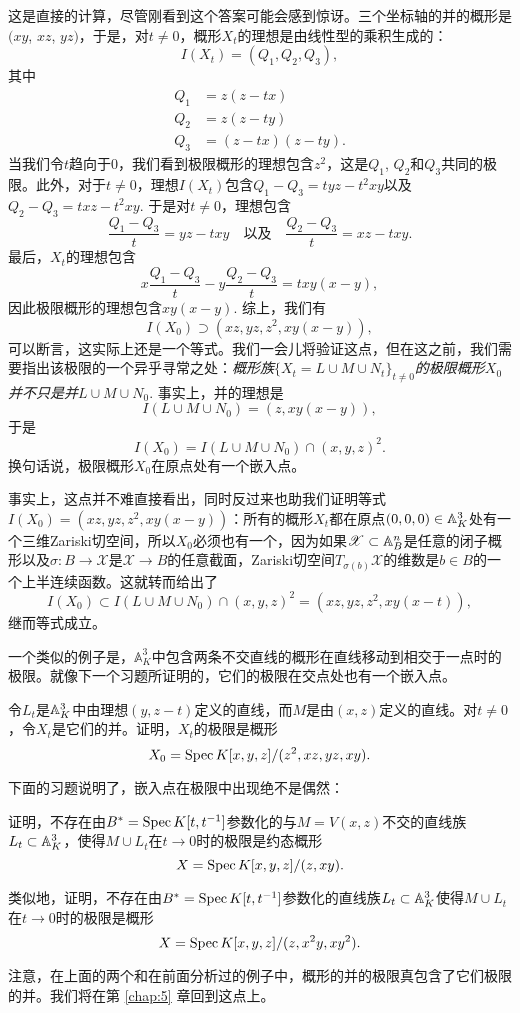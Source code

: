 这是直接的计算，尽管刚看到这个答案可能会感到惊讶。三个坐标轴的并的概形是$(xy$, $xz$, $yz)$，于是，对$t\neq 0$，概形$X_t$的理想是由线性型的乘积生成的：
\[
	I(X_t)=(Q_1,Q_2,Q_3),
\]
其中
\[
	\begin{aligned}
		Q_1&=z(z-tx)\\
		Q_2&=z(z-ty)\\
		Q_3&=(z-tx)(z-ty).
	\end{aligned}
\]
当我们令$t$趋向于$0$，我们看到极限概形的理想包含$z^2$，这是$Q_1$, $Q_2$和$Q_3$共同的极限。此外，对于$t\neq 0$，理想$I(X_t)$包含$Q_1-Q_3=tyz-t^2xy$以及$Q_2-Q_3=txz-t^2xy$. 于是对$t\neq 0$，理想包含
\[
	\frac{Q_1-Q_3}{t}=yz-txy\quad\text{以及}\quad \frac{Q_2-Q_3}{t}=xz-txy.
\]
最后，$X_t$的理想包含
\[
	x\frac{Q_1-Q_3}{t}-y\frac{Q_2-Q_3}{t}=txy(x-y),
\]
因此极限概形的理想包含$xy(x-y)$. 综上，我们有
\[
	I(X_0)\supset (xz,yz,z^2,xy(x-y)),
\]
可以断言，这实际上还是一个等式。我们一会儿将验证这点，但在这之前，我们需要指出该极限的一个异乎寻常之处：\textit{概形族}$\{X_t=L\cup M\cup N_t\}_{t\neq 0}$\textit{的极限概形}$X_0$\textit{并不只是并}$L\cup M\cup N_0$. 事实上，并的理想是
\[
	I(L\cup M\cup N_0)=(z,xy(x-y)),
\]
于是
\[
	I(X_0)=I(L\cup M\cup N_0)\cap (x,y,z)^2.
\]
换句话说，极限概形$X_0$在原点处有一个嵌入点。

事实上，这点并不难直接看出，同时反过来也助我们证明等式$I(X_0)=(xz,yz,z^2,xy(x-y))$：所有的概形$X_t$都在原点$(0,0,0)\in\mathbb{A}_K^3$处有一个三维Zariski切空间，所以$X_0$必须也有一个，因为如果$\mathscr{X}\subset \mathbb{A}_B^n$是任意的闭子概形以及$\sigma:B\to\mathscr{X}$是$\mathscr{X}\to B$的任意截面，Zariski切空间$T_{\sigma(b)}\mathscr{X}$的维数是$b\in B$的一个上半连续函数。这就转而给出了
\[
	I(X_0)\subset I(L\cup M\cup N_0)\cap (x,y,z)^2=(xz,yz,z^2,xy(x-t)),
\]
继而等式成立。

一个类似的例子是，$\mathbb{A}_K^3$中包含两条不交直线的概形在直线移动到相交于一点时的极限。就像下一个习题所证明的，它们的极限在交点处也有一个嵌入点。

\begin{exe}
令$L_t$是$\mathbb{A}_K^3$中由理想$(y,z-t)$定义的直线，而$M$是由$(x,z)$定义的直线。对$t\neq 0$，令$X_t$是它们的并。证明，$X_t$的极限是概形
\[
	X_0=\operatorname{Spec} K[x,y,z]/(z^2,xz,yz,xy).
\]

\end{exe}

下面的习题说明了，嵌入点在极限中出现绝不是偶然：

\begin{exe}
\begin{compactenum}[(a)]
\item 证明，不存在由$B^*=\operatorname{Spec} K[t,t^{-1}]$参数化的与$M=V(x,z)$不交的直线族$L_t\subset \mathbb{A}_K^3$，使得$M\cup L_t$在$t\to 0$时的极限是约态概形
\[
	X=\operatorname{Spec} K[x,y,z]/(z,xy).
\]

\item 类似地，证明，不存在由$B^*=\operatorname{Spec} K[t,t^{-1}]$参数化的直线族$L_t\subset \mathbb{A}_K^3$使得$M\cup L_t$在$t\to 0$时的极限是概形
\[
	X=\operatorname{Spec} K[x,y,z]/(z,x^2y,xy^2).
\]
\end{compactenum}

注意，在上面的两个和在前面分析过的例子中，概形的并的极限真包含了它们极限的并。我们将在第 \ref{chap:5} 章回到这点上。
\end{exe}

